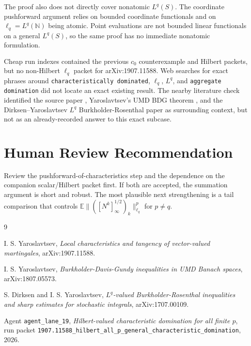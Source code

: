 \documentclass[11pt]{article}
\newcommand{\E}{\mathbb E}
\begin{document}
The proof also does not directly cover nonatomic \(L^q(S)\).  The coordinate
pushforward argument relies on bounded coordinate functionals and on
\(\ell_q=L^q(\mathbb N)\) being atomic.  Point evaluations are not bounded
linear functionals on a general \(L^q(S)\), so the same proof has no immediate
nonatomic formulation.

Cheap run indexes contained the previous \(c_0\) counterexample and Hilbert
packets, but no non-Hilbert \(\ell_q\) packet for arXiv:1907.11588.  Web
searches for exact phrases around \texttt{characteristically dominated},
\(\ell_q\), \(L^q\), and \texttt{aggregate domination} did not locate an exact
existing result.  The nearby literature check identified the source paper
\cite{Yaroslavtsev2019}, Yaroslavtsev's UMD BDG theorem
\cite{Yaroslavtsev2018}, and the Dirksen--Yaroslavtsev \(L^q\)
Burkholder-Rosenthal paper \cite{DirksenYaroslavtsev2017} as surrounding
context, but not as an already-recorded answer to this exact subcase.

\section*{Human Review Recommendation}

Review the pushforward-of-characteristics step and the dependence on the
companion scalar/Hilbert packet first.  If both are accepted, the summation
argument is short and robust.  The most plausible next strengthening is a
tail comparison that controls
\(\E\|([N^k]_\infty^{1/2})_k\|_{\ell_q}^p\) for \(p\ne q\).

\begin{thebibliography}{9}

I. S. Yaroslavtsev,
\emph{Local characteristics and tangency of vector-valued martingales},
arXiv:1907.11588.

I. S. Yaroslavtsev,
\emph{Burkholder-Davis-Gundy inequalities in UMD Banach spaces},
arXiv:1807.05573.

S. Dirksen and I. S. Yaroslavtsev,
\emph{\(L^q\)-valued Burkholder-Rosenthal inequalities and sharp estimates for
stochastic integrals},
arXiv:1707.00109.

Agent \texttt{agent\_lane\_19},
\emph{Hilbert-valued characteristic domination for all finite \(p\)},
run packet
\texttt{1907.11588\_hilbert\_all\_p\_general\_characteristic\_domination},
2026.

\end{thebibliography}
\end{document}
